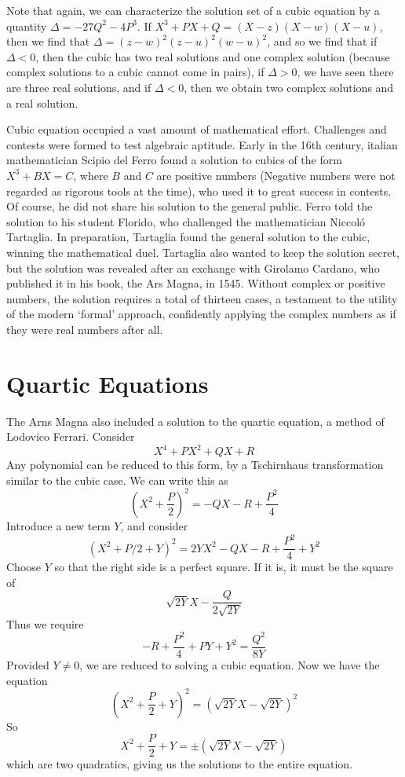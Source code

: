 Note that again, we can characterize the solution set of a cubic equation by a quantity $\Delta = -27Q^2 - 4P^3$. If $X^3 + PX + Q = (X - z)(X - w)(X - u)$, then we find that $\Delta = (z - w)^2(z - u)^2(w-u)^2$, and so we find that if $\Delta < 0$, then the cubic has two real solutions and one complex solution (because complex solutions to a cubic cannot come in pairs), if $\Delta > 0$, we have seen there are three real solutions, and if $\Delta < 0$, then we obtain two complex solutions and a real solution.

Cubic equation occupied a vast amount of mathematical effort. Challenges and contests were formed to test algebraic aptitude. Early in the 16th century, italian mathematician Scipio del Ferro found a solution to cubics of the form $X^3 + BX = C$, where $B$ and $C$ are positive numbers (Negative numbers were not regarded as rigorous tools at the time), who used it to great success in contests. Of course, he did not share his solution to the general public. Ferro told the solution to his student Florido, who challenged the mathematician Niccol\'{o} Tartaglia. In preparation, Tartaglia found the general solution to the cubic, winning the mathematical duel. Tartaglia also wanted to keep the solution secret, but the solution was revealed after an exchange with Girolamo Cardano, who published it in his book, the Ars Magna, in 1545. Without complex or positive numbers, the solution requires a total of thirteen cases, a testament to the utility of the modern `formal' approach, confidently applying the complex numbers as if they were real numbers after all.

\section{Quartic Equations}

The Arns Magna also included a solution to the quartic equation, a method of Lodovico Ferrari. Consider
%
\[ X^4 + PX^2 + QX + R \]
%
Any polynomial can be reduced to this form, by a Tschirnhaus transformation similar to the cubic case. We can write this as
%
\[ (X^2 + \frac{P}{2})^2 = -QX - R + \frac{P^2}{4} \]
%
Introduce a new term $Y$, and consider
%
\[ (X^2 + P/2 + Y)^2 = 2YX^2 - QX - R + \frac{P^2}{4} + Y^2 \]
%
Choose $Y$ so that the right side is a perfect square. If it is, it must be the square of
%
\[ \sqrt{2Y}X - \frac{Q}{2\sqrt{2Y}} \]
%
Thus we require
%
\[ -R + \frac{P^2}{4} + PY + Y^2 = \frac{Q^2}{8Y} \]
%
Provided $Y \neq 0$, we are reduced to solving a cubic equation. Now we have the equation
%
\[ (X^2 + \frac{P}{2} + Y)^2 = (\sqrt{2Y}X - \sqrt{2Y})^2 \]
%
So
%
\[ X^2 + \frac{P}{2} + Y = \pm(\sqrt{2Y}X - \sqrt{2Y}) \]
%
which are two quadratics, giving us the solutions to the entire equation.

